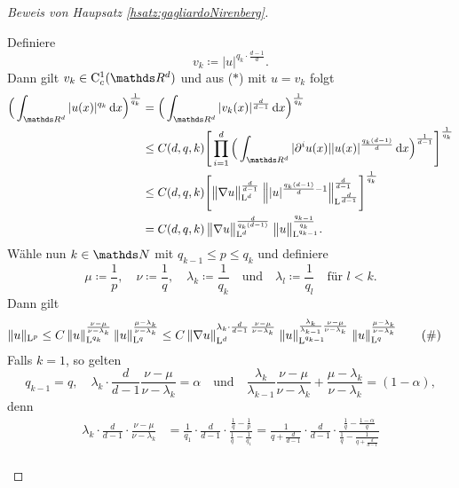 \begin{proof}[Beweis von Haupsatz \ref{hsatz:gagliardoNirenberg}]
\begin{enumerate}
      Definiere
      $$
      v_k \coloneqq |u|^{q_k \cdot \frac{d - 1}{d}}.
      $$
      Dann gilt $v_k \in \CC_c^1(\R^d)$ und aus ($\ast$) mit $u = v_k$ folgt
      \begin{align*}
        \Big( \int_{\R^d} |u(x)|^{q_k} \d x \Big)^{\frac{1}{q_k}}
        &= \Big( \int_{\R^d} |v_k(x)|^{\frac{d}{d - 1}} \d x \Big)^{\frac{1}{q_k}} \\
        &\leq C(d,q,k) \Bigg[ \prod_{i = 1}^d \Big( \int_{\R^d} |\partial^i u(x)||u(x)|^{\frac{q_k(d - 1)}{d }} \d x \Big)^{\frac{1}{d - 1}} \Bigg]^{\frac{1}{q_k}} \\
        &\leq C(d,q,k) \Bigg[ \big\|\nabla u\big\|_{\Ell^d}^{\frac{d}{d - 1 }} \; \Big\| |u|^{\frac{q_k (d - 1)}{d} - 1} \Big\|_{\Ell^{\frac{d}{d - 1}}}^{\frac{d}{d - 1}} \Bigg]^{\frac{1}{q_k}} \\
        &= C(d,q,k) \, \big\|\nabla u\big\|_{\Ell^d}^{\frac{d}{q_k (d - 1)}} \; \big\|u\big\|_{\Ell^{q_{k - 1}}}^{\frac{q_{k - 1}}{q_k}}.
      \end{align*}
      Wähle nun $k \in \N$ mit $q_{k - 1} \leq p \leq q_k$ und definiere 
      $$
      \mu \coloneqq \frac{1}{p}, \quad \nu \coloneqq \frac{1}{q}, \quad \lambda_k \coloneqq \frac{1}{q_k} \quad\text{und}\quad \lambda_l \coloneqq \frac{1}{q_l} \quad\text{für } l < k.
      $$
      Dann gilt
      \begin{align*}
        \|u\|_{\mathrm{L}^p}
        &\leq C \, \|u\|_{\mathrm{L}^{q_k}}^{\frac{\nu - \mu}{\nu - \lambda_k}} \, \|u\|_{\mathrm{L}^q}^{\frac{\mu - \lambda_k}{\nu - \lambda_k}} 
        \leq C \, \|\nabla u\|_{\mathrm{L}^d}^{\lambda_k \cdot \frac{d}{d - 1} \, \frac{\nu - \mu}{\nu - \lambda_k}} \; \|u\|_{\mathrm{L}^{q_{k - 1}}}^{\frac{\lambda_k}{\lambda_{k - 1}} \frac{\nu - \mu}{\nu - \lambda_k}}  \; \|u\|_{\mathrm{L}^{q}}^{\frac{\mu - \lambda_k}{\nu - \lambda_k}}  \tag{\#}
      \end{align*}
      Falls $k = 1$, so gelten 
      $$
      q_{k - 1} = q, \quad \lambda_k \cdot \frac{d}{d - 1}\frac{\nu - \mu}{\nu - \lambda_k} = \alpha \quad\text{und}\quad \frac{\lambda_k}{\lambda_{k - 1}} \frac{\nu - \mu}{\nu - \lambda_k} + \frac{\mu - \lambda_k}{\nu - \lambda_k}=  (1 - \alpha),
      $$
      denn
      \begin{align*}
      \lambda_k \cdot \frac{d}{d - 1} \cdot \frac{\nu - \mu}{\nu - \lambda_k}
        &= \frac{1}{q_1} \cdot \frac{d}{d - 1} \cdot \frac{\frac{1}{q} - \frac{1}{p}}{\frac{1}{q} - \frac{1}{q_1}} 
        = \frac{1}{q + \frac{d}{d - 1}} \cdot \frac{d}{d - 1} \cdot \frac{\frac{1}{q} - \frac{1 - \alpha}{q}}{\frac{1}{q} - \frac{1}{q + \frac{d}{d - 1}}}  \\

\end{align*}
\end{enumerate}
\end{proof}
